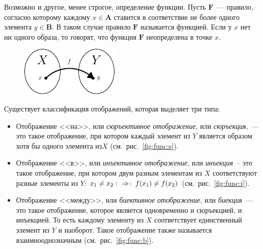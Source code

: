 Возможно и другое, менее строгое, определение функции. Пусть $\mathbf F$~--- правило, согласно которому каждому $x\in\mathbf A$ ставится в соответствие не более одного элемента $y\in\mathbf B$. В таком случае правило $\mathbf F$ называется функцией. Если у $x$ нет ни одного образа, то говорят, что функция $\mathbf F$ неопределена в точке $x$.

\begin{figure}
	\vspace{-.33cm}
	\includegraphics{graph/mapping-def}
\end{figure}

Существует классификация отображений, которая выделяет три типа:

\begin{itemize}
	\item{}
		Отображение <<на>>, или \emph{сюръективное отображение}, или
		\emph{сюръекция},~--- это такое отображение, при котором каждый элемент из $Y$
		является образом хотя бы одного элемента из\newline $X$ (см.~рис.~\ref{fig:func:s}).
	\item{}
		Отображение <<в>>, или \emph{инъективное отображение}, или \emph{инъекция}~--
		это такое отображение, при котором двум разным элементам из $X$ соответствуют
		разные элементы из $Y$: $x_1\ne x_2 \mathbin{\colon\Rightarrow \colon} f(x_1)\ne f(x_2)$ (см.~рис.~\ref{fig:func:i}).
	\item{}
		Отображение <<между>>, или \emph{биективное отображение}, или \emph{биекция}~---
		это такое отображение, которое является одновременно и сюръекцией, и инъекцией. То
		есть каждому элементу из $X$ соответствует единственный элемент из $Y$ и наоборот.
		Такое отображение также называется взаимнооднозначным (см.~рис.~\ref{fig:func:b}).
\end{itemize}


